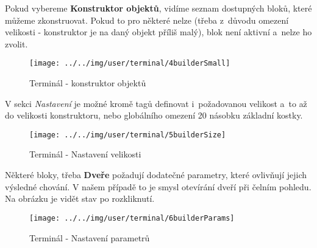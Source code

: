 \FloatBarrier

Pokud vybereme \textbf{Konstruktor objektů}, vidíme seznam dostupných bloků, které můžeme zkonstruovat. Pokud to pro některé nelze (třeba z~důvodu omezení velikosti - konstruktor je na daný objekt příliš malý), blok není aktivní a~nelze ho zvolit.


\begin{figure}[!ht]\centering
\texttt{[image: ../../img/user/terminal/4builderSmall]}

\caption{Terminál - konstruktor objektů}
\label{fig:user_terminal_4builderSmall}

\end{figure}

\FloatBarrier

V sekci \textit{Nastavení} je možné kromě tagů definovat i~požadovanou velikost a~to až do velikosti konstruktoru, nebo globálního omezení 20 násobku základní kostky.

\begin{figure}[!ht]\centering
\texttt{[image: ../../img/user/terminal/5builderSize]}

\caption{Terminál - Nastavení velikosti}
\label{fig:user_terminal_5builderSize}

\end{figure}

\FloatBarrier

Některé bloky, třeba \textbf{Dveře} požadují dodatečné parametry, které ovlivňují jejich výsledné chování. V našem případě to je smysl otevírání dveří při čelním pohledu. Na obrázku je vidět stav po rozkliknutí.

\begin{figure}[!ht]\centering
\texttt{[image: ../../img/user/terminal/6builderParams]}

\caption{Terminál - Nastavení parametrů}
\label{fig:user_terminal_6builderParams}

\end{figure}

\FloatBarrier